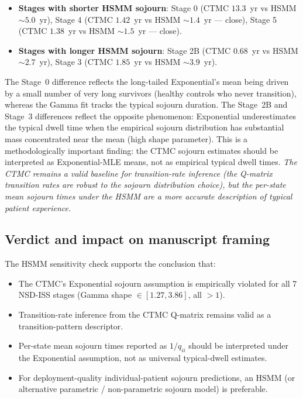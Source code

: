 \documentclass[11pt]{article}
\begin{document}
\begin{itemize}\itemsep=0.2em
  \item \textbf{Stages with shorter HSMM sojourn}: Stage 0 (CTMC $13.3$~yr vs HSMM $\sim 5.0$~yr), Stage 4 (CTMC $1.42$~yr vs HSMM $\sim 1.4$~yr --- close), Stage 5 (CTMC $1.38$~yr vs HSMM $\sim 1.5$~yr --- close).
  \item \textbf{Stages with longer HSMM sojourn}: Stage 2B (CTMC $0.68$~yr vs HSMM $\sim 2.7$~yr), Stage 3 (CTMC $1.85$~yr vs HSMM $\sim 3.9$~yr).
\end{itemize}

The Stage~0 difference reflects the long-tailed Exponential's mean being driven by a small number of very long survivors (healthy controls who never transition), whereas the Gamma fit tracks the typical sojourn duration. The Stage~2B and Stage~3 differences reflect the opposite phenomenon: Exponential underestimates the typical dwell time when the empirical sojourn distribution has substantial mass concentrated near the mean (high shape parameter). This is a methodologically important finding: the CTMC sojourn estimates should be interpreted as Exponential-MLE means, not as empirical typical dwell times. \emph{The CTMC remains a valid baseline for transition-rate inference (the Q-matrix transition rates are robust to the sojourn distribution choice), but the per-state mean sojourn times under the HSMM are a more accurate description of typical patient experience.}

\subsection*{Verdict and impact on manuscript framing}

The HSMM sensitivity check supports the conclusion that:

\begin{itemize}\itemsep=0.2em
  \item The CTMC's Exponential sojourn assumption is empirically violated for all 7 NSD-ISS stages (Gamma shape $\in [1.27, 3.86]$, all $> 1$).
  \item Transition-rate inference from the CTMC Q-matrix remains valid as a transition-pattern descriptor.
  \item Per-state mean sojourn times reported as $1/q_{ii}$ should be interpreted under the Exponential assumption, not as universal typical-dwell estimates.
  \item For deployment-quality individual-patient sojourn predictions, an HSMM (or alternative parametric / non-parametric sojourn model) is preferable.
\end{itemize}
\end{document}

